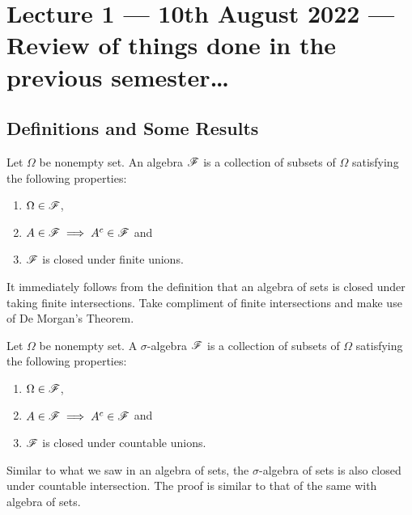 \section{Lecture 1 --- 10th August 2022 --- Review of things done in the previous semester\ldots}



\subsection{Definitions and Some Results}
\begin{definition}[algebra]
    Let $\Omega$ be nonempty set. An algebra ${\mathscr F}$ is a collection of subsets of $\Omega$ satisfying the following properties:
    \begin{enumerate}
	\item $\Omega \in {\mathscr F}$,
	\item $A\in {\mathscr F} \implies A^c \in {\mathscr F}$ and
	\item ${\mathscr F}$ is closed under finite unions.
    \end{enumerate}
    \label{def:algebra}
\end{definition}

\begin{remark}
    It immediately follows from the definition that an algebra of sets is closed under taking finite intersections. Take compliment of finite intersections and make use of De Morgan's Theorem.
\end{remark}

\begin{definition}
    Let $\Omega$ be nonempty set. A $\sigma$-algebra ${\mathscr F}$ is a collection of subsets of $\Omega$ satisfying the following properties:
    \begin{enumerate}
	\item $\Omega \in {\mathscr F}$,
	\item $A\in {\mathscr F} \implies A^c \in {\mathscr F}$ and
	\item ${\mathscr F}$ is closed under countable unions.
    \end{enumerate}
    \label{def:sigma-algebra}
\end{definition}

\begin{remark}
    Similar to what we saw in an algebra of sets, the $\sigma$-algebra of sets is also closed under countable intersection. The proof is similar to that of the same with algebra of sets.
\end{remark}

